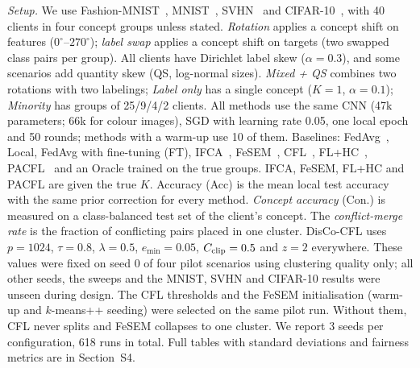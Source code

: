 \documentclass[journal]{IEEEtran}
\theoremstyle{definition}
\begin{document}
\emph{Setup.} We use Fashion-MNIST~\cite{xiao2017fmnist}, MNIST~\cite{lecun1998mnist}, SVHN~\cite{netzer2011svhn} and CIFAR-10~\cite{krizhevsky2009cifar}, with 40 clients in four concept groups unless stated. \emph{Rotation} applies a concept shift on features ($0^\circ$--$270^\circ$); \emph{label swap} applies a concept shift on targets (two swapped class pairs per group). All clients have Dirichlet label skew ($\alpha=0.3$), and some scenarios add quantity skew (QS, log-normal sizes). \emph{Mixed + QS} combines two rotations with two labelings; \emph{Label only} has a single concept ($K=1$, $\alpha=0.1$); \emph{Minority} has groups of 25/9/4/2 clients. All methods use the same CNN (47k parameters; 66k for colour images), SGD with learning rate 0.05, one local epoch and 50 rounds; methods with a warm-up use 10 of them. Baselines: FedAvg~\cite{mcmahan2017fedavg}, Local, FedAvg with fine-tuning (FT), IFCA~\cite{ghosh2020ifca}, FeSEM~\cite{long2023fesem}, CFL~\cite{sattler2021cfl}, FL+HC~\cite{briggs2020flhc}, PACFL~\cite{vahidian2023pacfl} and an Oracle trained on the true groups. IFCA, FeSEM, FL+HC and PACFL are given the true $K$. Accuracy (Acc) is the mean local test accuracy with the same prior correction for every method. \emph{Concept accuracy} (Con.) is measured on a class-balanced test set of the client's concept. The \emph{conflict-merge rate} is the fraction of conflicting pairs placed in one cluster. DisCo-CFL uses $p=1024$, $\tau=0.8$, $\lambda=0.5$, $e_{\min}=0.05$, $C_{\rm clip}=0.5$ and $z=2$ everywhere. These values were fixed on seed 0 of four pilot scenarios using clustering quality only; all other seeds, the sweeps and the MNIST, SVHN and CIFAR-10 results were unseen during design. The CFL thresholds and the FeSEM initialisation (warm-up and $k$-means++ seeding) were selected on the same pilot run. Without them, CFL never splits and FeSEM collapses to one cluster. We report 3 seeds per configuration, 618 runs in total. Full tables with standard deviations and fairness metrics are in Section~S4.
\end{document}
